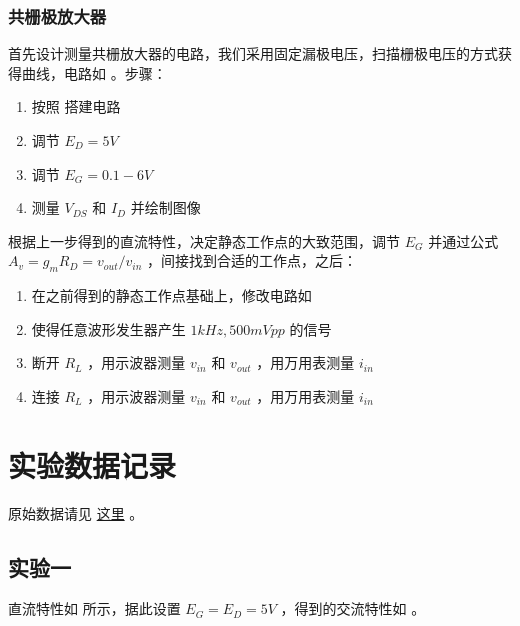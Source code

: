 \documentclass[lang=cn,11pt,a4paper,cite=authoryear]{elegantpaper}
\begin{document}

\subsubsection{共栅极放大器}

首先设计测量共栅放大器的电路，我们采用固定漏极电压，扫描栅极电压的方式获得曲线，电路如  。步骤：



\begin{enumerate}
    \item 按照  搭建电路
    \item 调节 \(E_D = 5 V\) 
    \item 调节 \(E_G = 0.1 - 6 V\) 
    \item 测量 \(V_{DS}\) 和 \(I_D\) 并绘制图像
\end{enumerate}

根据上一步得到的直流特性，决定静态工作点的大致范围，调节 \(E_G\) 并通过公式 \(A_v = g_m R_D = v_{out} / v_{in}\) ，间接找到合适的工作点，之后：

\begin{enumerate}
    \item 在之前得到的静态工作点基础上，修改电路如  
    \item 使得任意波形发生器产生 \(1 kHz, 500 mVpp \) 的信号 
    \item 断开 \(R_L\) ，用示波器测量 \(v_{in}\) 和 \(v_{out}\) ，用万用表测量 \(i_{in}\)
    \item 连接 \(R_L\) ，用示波器测量 \(v_{in}\) 和 \(v_{out}\) ，用万用表测量 \(i_{in}\) 
\end{enumerate}


\section{实验数据记录}

原始数据请见 \href{https://github.com/PannenetsF/Mirco-Electronic-Device-Experiment/tree/main/homework/hw13}{这里} 。

\subsection{实验一}


直流特性如  所示，据此设置 \(E_G = E_D = 5 V\) ，得到的交流特性如  。
\end{document}
